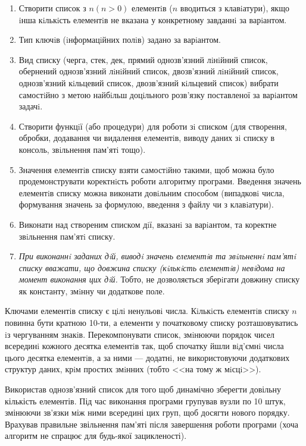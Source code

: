 
\def\basedir{/home/theammir/labs/asd/8/res}




\taskdesc%
\begin{enumerate}
  \item Створити список з $n (n > 0)$ елементiв ($n$ вводиться з клавiатури), якщо iнша кiлькiсть елементiв не вказана у конкретному завданнi за варiантом.
  \item Тип ключiв (iнформацiйних полiв) задано за варiантом.
  \item Вид списку (черга, стек, дек, прямий однозв’язний лiнiйний список, обернений однозв’язний лiнiйний список, 
    двозв’язний лiнiйний список, одно\-зв’язний кiльцевий список, двозв’язний кiльцевий список)
  вибрати самостiйно з метою найбiльш доцiльного розв’язку поставленої за варiантом задачi.
  \item Створити функцiї (або процедури) для роботи зi списком (для створення, обробки, додавання чи видалення елементiв, виводу даних зi списку в консоль, звiльнення пам’ятi тощо).
  \item Значення елементiв списку взяти самостiйно такими, щоб можна було продемонструвати коректнiсть роботи алгоритму програми.
    Введення значень елементiв списку можна виконати довiльним способом (випадковi числа, формування значень за формулою, введення з файлу чи з клавiатури).
  \item Виконати над створеним списком дiї, вказанi за варiантом, та коректне звiльнення пам’ятi списку.
  \item \emph{При виконаннi заданих дiй, виводi значень елементiв та звiльненнi пам’ятi списку вважати, що довжина списку (кiлькiсть елементiв)
    невiдома на момент виконання цих дiй.} Тобто, не дозволяється зберiгати довжину списку як константу, змiнну чи додаткове поле.
\end{enumerate}

\taskspec%
Ключами елементiв списку є цiлi ненульовi числа. Кiлькiсть елементiв списку $n$ повинна бути кратною 10-ти,
а елементи у початковому списку розташовуватись iз чергуванням знакiв.
Перекомпонувати список, змiнюючи порядок чисел всерединi кожного десятка елементiв так, щоб спочатку йшли вiд'ємнi числа
цього десятка елементiв, а за ними --- додатнi, не використовуючи додаткових структур даних, крiм простих змiнних
(тобто <<на тому ж мiсцi>>).


\tasktest%

\conclusion%
Використав однозв'язний список для того щоб динамічно зберегти довільну кількість елементів.
Під час виконання програми групував вузли по 10 штук, змінюючи зв'язки між ними всередині цих груп, щоб досягти нового порядку.
Врахував правильне звільнення пам'яті після завершення роботи програми (хоча алгоритм не спрацює для будь-якої зацикленості).




